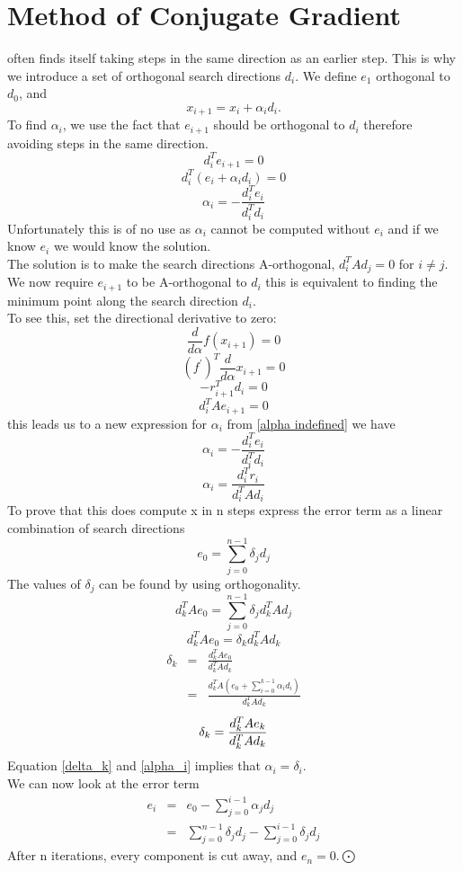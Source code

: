 \section{Method of Conjugate Gradient}
 often finds itself taking steps in the same direction as an earlier
step.  This is why we introduce a set of orthogonal search directions $d_i$.
We define $e_1$ orthogonal to $d_0$, and
\[
x_{i+1}= x_i + \alpha_i d_i. \]
To find $\alpha_i$, we use the fact that $e_{i+1}$ should be orthogonal to $d_i$
therefore avoiding steps in the same direction.
\[ d^{T}_{i}e_{i+1} =0\]
\[ d^{T}_{i}(e_{i}+\alpha_id_i) =0\]
\begin{equation}
\label{alpha indefined}
\alpha_i = - \frac{d_i^Te_i}{d_i^Td_i}
\end{equation}
Unfortunately this is of no use as $\alpha_i$ cannot be computed without $e_i$ and if we know $e_i$ we would know the solution.\\
The solution is to make the search directions A-orthogonal, $d_i^TAd_j=0$ for $i\not= j$.\\
We now require $e_{i+1}$ to be A-orthogonal to $d_i$ this is equivalent to finding 
the minimum point along the search direction $d_i$.\\
To see this, set the directional derivative to zero:
\[\frac{d}{d\alpha}f(x_{i+1}) = 0 \]
\[(f^{'})^T\frac{d}{d\alpha}x_{i+1} = 0 \]
\[-r_{i+1}^Td_i=0 \]
\[d^T_iAe_{i+1} = 0 \]
this leads us to a new expression for $\alpha_i$ from 
\ref{alpha indefined} we have 
\[
\alpha_i = - \frac{d_i^Te_i}{d_i^Td_i}
\]
\begin{equation}
\label{alpha_i}
\alpha_i = \frac{d_i^Tr_i}{d_i^TAd_i}
\end{equation}
To prove that this does compute x in n steps express the error term as a linear
combination of search directions
\[e_0 = \sum_{j=0}^{n-1}\delta_jd_j \]
The values of $\delta_j$ can be found by using orthogonality.
\[d_k^TAe_0 = \sum_{j=0}^{n-1}\delta_jd_k^TAd_j \]
\[d_k^TAe_0 = \delta_kd_k^TAd_k \]
\begin{eqnarray*}
\delta_k&= &\frac{d_k^TAe_0}{d_k^TAd_k} \\
&= &\frac{d_k^TA(e_0+\sum_{i=0}^{k-1}\alpha_id_i)}{d_k^TAd_k} 
\end{eqnarray*}
\begin{equation}
\label{delta_k}
\delta_k =  \frac{d_k^TAe_k}{d_k^TAd_k} \\
\end{equation}
Equation \ref{delta_k} and \ref{alpha_i} implies that $\alpha_i=\delta_i$.\\
We can now look at the error term 
\begin{eqnarray*}
e_i &= &e_0 - \sum_{j=0}^{i-1} \alpha_j d_j \\
 &= & \sum_{j=0}^{n-1} \delta_j d_j - \sum_{j=0}^{i-1} \delta_j d_j 
\end{eqnarray*}
After n iterations, every component is cut away, and $e_n=0$.$\bigodot$
